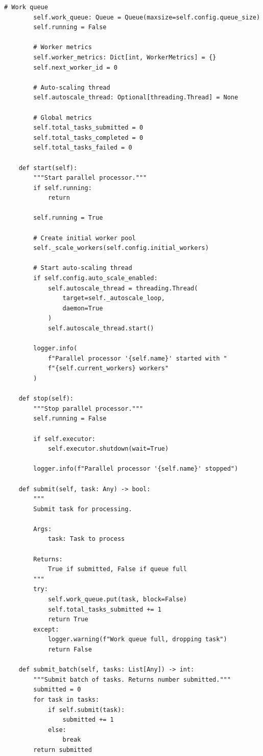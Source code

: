 \begin{lstlisting}[style=python, caption={Parallel Processor with Dynamic Allocation}]
        # Work queue
        self.work_queue: Queue = Queue(maxsize=self.config.queue_size)
        self.running = False

        # Worker metrics
        self.worker_metrics: Dict[int, WorkerMetrics] = {}
        self.next_worker_id = 0

        # Auto-scaling thread
        self.autoscale_thread: Optional[threading.Thread] = None

        # Global metrics
        self.total_tasks_submitted = 0
        self.total_tasks_completed = 0
        self.total_tasks_failed = 0

    def start(self):
        """Start parallel processor."""
        if self.running:
            return

        self.running = True

        # Create initial worker pool
        self._scale_workers(self.config.initial_workers)

        # Start auto-scaling thread
        if self.config.auto_scale_enabled:
            self.autoscale_thread = threading.Thread(
                target=self._autoscale_loop,
                daemon=True
            )
            self.autoscale_thread.start()

        logger.info(
            f"Parallel processor '{self.name}' started with "
            f"{self.current_workers} workers"
        )

    def stop(self):
        """Stop parallel processor."""
        self.running = False

        if self.executor:
            self.executor.shutdown(wait=True)

        logger.info(f"Parallel processor '{self.name}' stopped")

    def submit(self, task: Any) -> bool:
        """
        Submit task for processing.

        Args:
            task: Task to process

        Returns:
            True if submitted, False if queue full
        """
        try:
            self.work_queue.put(task, block=False)
            self.total_tasks_submitted += 1
            return True
        except:
            logger.warning(f"Work queue full, dropping task")
            return False

    def submit_batch(self, tasks: List[Any]) -> int:
        """Submit batch of tasks. Returns number submitted."""
        submitted = 0
        for task in tasks:
            if self.submit(task):
                submitted += 1
            else:
                break
        return submitted


\end{lstlisting}
